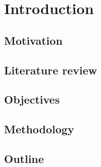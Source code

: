 \chapter[Introduction]{Introduction}

\section{Motivation}

\section{Literature review}
\cite{rykhlevskii_online_2017}
\section{Objectives}

\section{Methodology}

\section{Outline}

